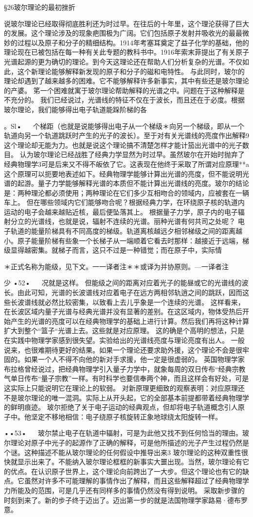§26玻尔理论的最初挫折

说玻尔理论已经取得彻底胜利还为时过早。在往后的十年里，这个理沦获得了巨大的发展。这个理论涉及的现象疤围极为广阔。它们包括原子发射并吸收光的最最微妙的过程以及原子和分子的精细结构。1914年考塞耳奠定了益子化学的基础，他的理论现在已被包括在每一种有关此专题的教科书中。1916年索末菲提出了有关原子光谱起源的更为确切的理论。到今天这理论还在帮助人们分析复杂的光谱。不仅如此，这个新理论能够解释新发现的原子和分子的磁和电特性。
与此同时，玻尔的理论却遇到了越来越多的困难。它不能够解释许多新事实，其中有些还是玻尔理论的产婆。
笫一个困难就寓于玻尔理论帮助解释的光谱之中。问题在于这种解释是不充分的。
我们已经说过，光谱线的特征不仅在于波长，而且还在于必度。根据玻尔理论，我们能够得出电子轨道能跺阶梯的各

。Sl•
  
个梯距（也就是说能够得出电子从一个梯级＊向另一个梯级，即从一个轨道向另一个轨道跳跃时产生的光子的波长）。至于对有关光谱线的亮度作出解释9这个理论却无能为力。也就是说这个理论搞不清楚怎样才能计笳出光谱中的光子数目。
认为玻尔理论已经战胜了经典力学显然为时过早。虽然玻尔在开始时抛弃了经典物理学3可是后来又不得不皈依了它。这表现在他终于采取了所谓对应原理**a
这个原理可以扼要地表述如下。经典物理学能够计算出光谱的亮度，但不能说明光谱的起游。量子力学能够解释光谱的本质但不能计算出光谱线的亮度。玻尔的结论是：两种理沦都必须使用；两种理论在它们多少互相吻合的领域内，应被套在一辆车上。
但在哪些领域内它们能够吻合呢？根据经典力学，在环绕原子核的轨道内运动的电子会越来越贴近核，最后便坠落其上。
根据量子力学，原子内的电子辐射分立的光谱线，也就是说，辐射不连续的光谱。丽种光谱有何共司之处呢？
电子轨道的能量阶梯具有不同高度的梯级。轨道离核越远夕相邻梯级之间的距离越小。原子能量阶梯有些象一个长梯子从一端顺着它看去时那样：越接近于远端，梯级显得越密集。就梯子而言，这只不过是一种错觉；而在原子中，实际情

＊正式名称为能级，见下文。一一译者注＊＊或译为并协原则。—一译者注

少
•52•
  
况就是这样。
但能级之间的距离对应着光子的能昼或它的光谱线的波长。由此可知，光谱的长波谱线对应着电子在远方两相邻轨逍之间的跳跃，因而这些长波谱线就必然比较密集，以致看上去儿乎象是一个连续的光谱。
这样看来，在长波区域内量子光谱与经典光谱并没有显著的差别。在这区域内，物体受热后开始产生的光谱的亮度可以在经典物理学的基础上进行计算。然后我们再将这种计算扩大到整个“篮子“光谱上去。这些就是对应原理。
这的确是个高明的想法，只是在实践中物理学家感到很失望。实验给出的光谱线亮度与理论亮度有出人。
一般说来，也很难期待更好的结果。如果一个理论还要求助外援，这个理论不会是很牢固的。如果一个人不得不向他的新对手求援，他一定是很虚弱的。
英国物理学家布拉格曾经说过，把经典物理学引入量子力学中，就象每周的双日传布“经典宗教气单日传布“量子宗教”一样。有时科学也要信奉两个神，而且这样会有好处，可是这实际上只能说明它在理论上的软弱。
对新原理更细致的观察表明：对应原理还不是玻尔理论的唯一混洞。实际上从开头起，它的全部基本前提都带着经典物理学的鲜明痕迹。
玻尔拒绝了关于电子运动的经典观点，但却将电子轨道概念引人原子中。他坚定不移地相信：电子绕原子核旋转正象地球绕太阳旋转一样。

••53•
  
玻尔禁止电子在轨道中辐射，可是为此他又找不到任何恰当的理由。玻尔理论对原子中光子的起源作了正确的解释，可是他所描述的光子产生过程仍然是个谜。这种描述不能从玻尔理论的任何假设中推导出来3
玻尔理论的这种双重性很快就显示出来了。不能纳入玻尔理论框框的新事实大噩出现。当然，玻尔理论有它的优点。在认识原子世界上，这个理论向前跨出了一大步。但这个理论也有它的缺点。它虽然对许多不可能理解的事情作出了解释，而且这些解释超过了经典物理学力所能及的范围，可是几乎还有同样多的事情仍然没有得到说明。
采取新步骤的时刻到来了。新的步子终于迈出了。迈出第一步的就是法国物理学家路易·德布罗意。

